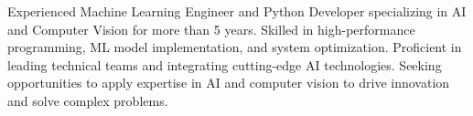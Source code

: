 


\justifying
\normalfont Experienced Machine Learning Engineer and Python Developer specializing in AI and Computer Vision for more than 5 years. Skilled in high-performance programming, ML model implementation, and system optimization. Proficient in leading technical teams and integrating cutting-edge AI technologies. Seeking opportunities to apply expertise in AI and computer vision to drive innovation and solve complex problems.
